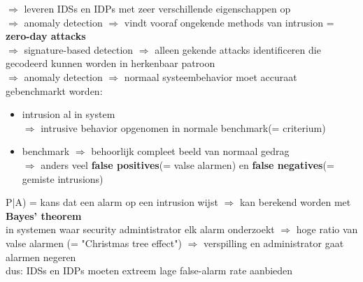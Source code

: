 \documentclass{report}
\begin{document}
$\Rightarrow$ leveren IDSs en IDPs met zeer verschillende eigenschappen op 
\\$\Rightarrow$ anomaly detection $\Rightarrow$ vindt vooraf ongekende methods van intrusion = \textbf{zero-day attacks}
\\$\Rightarrow$ signature-based detection $\Rightarrow$ alleen gekende attacks identificeren die gecodeerd kunnen worden in herkenbaar patroon
\\$\Rightarrow$ anomaly detection $\Rightarrow$ normaal systeembehavior moet accuraat gebenchmarkt worden:
\begin{itemize}
\item intrusion al in system 
\\$\Rightarrow$ intrusive behavior opgenomen in normale benchmark(= criterium)
\item benchmark $\Rightarrow$ behoorlijk compleet beeld van normaal gedrag
\\$\Rightarrow$ anders veel \textbf{false positives}(= valse alarmen) en \textbf{false negatives}(= gemiste intrusions)
\end{itemize}
P|A) = kans dat een alarm op een intrusion wijst $\Rightarrow$ kan berekend worden met \textbf{Bayes' theorem}
\\ in systemen waar security admintistrator elk alarm onderzoekt $\Rightarrow$ hoge ratio van valse alarmen (= "Christmas tree effect") $\Rightarrow$ verspilling en administrator gaat alarmen negeren
\\dus: IDSs en IDPs moeten extreem lage false-alarm rate aanbieden
\end{document}
